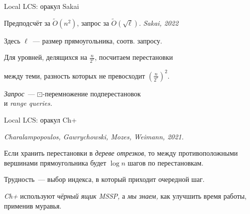 \documentclass[svgnames]{beamer}
\newcommand{\flink}[1]{{\footnotesize\it\color{SkyBlue!40!White} #1}}
\begin{document}
\begin{frame}{Local LCS: оракул Sakai}
\vspace{-2mm}

Предподсчёт за \(\tilde O\left(n^2\right)\), запрос за \(\tilde O\left( \sqrt{\ell} \right)\). \hfill \flink{Sakai, 2022}

Здесь \(\ell\)~— размер прямоугольника, соотв. запросу.
\vspace{3mm}

Для уровней, делящихся на \(\frac{n}{2^r}\), посчитаем перестановки \vspace{-2mm}

между теми, разность которых не превосходит \(\left( \frac{n}{2^r} \right)^2\).

\begin{center}  \end{center}

{\it Запрос}~— \(\boxdot\)-перемножение подперестановок \\
и {\it range queries.}

\end{frame}


\begin{frame}{Local LCS: оракул Ch+}

\flink{Charalampopoulos, Gawrychowski, Mozes, Weimann, 2021.} \vspace{4mm}

Если хранить перестановки в {\it дереве отрезков}, то между противоположными вершинами прямоугольника будет \(\log n\) шагов по перестановкам. \vspace{4mm}

Трудность~— выбор индекса, в который приходит очередной шаг. \vspace{4mm}

{\it Ch+} используют {\it чёрный ящик MSSP,} а {\it мы знаем,} как улучшить время работы, применив муравья. 
\end{frame}
\end{document}
